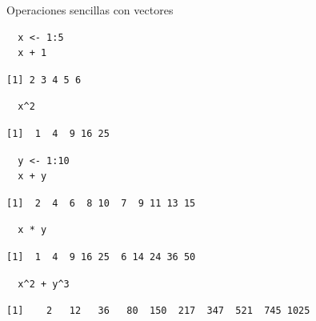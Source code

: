 \documentclass[xcolor={usenames,svgnames,dvipsnames}]{beamer}
\begin{document}
\begin{frame}[fragile,label=sec-2-1-4]{Operaciones sencillas con vectores}
 \lstset{language=R,label= ,caption= ,numbers=none}
\begin{lstlisting}
  x <- 1:5
  x + 1
\end{lstlisting}

\begin{verbatim}
[1] 2 3 4 5 6
\end{verbatim}

\lstset{language=R,label= ,caption= ,numbers=none}
\begin{lstlisting}
  x^2
\end{lstlisting}

\begin{verbatim}
[1]  1  4  9 16 25
\end{verbatim}

\lstset{language=R,label= ,caption= ,numbers=none}
\begin{lstlisting}
  y <- 1:10
  x + y
\end{lstlisting}

\begin{verbatim}
[1]  2  4  6  8 10  7  9 11 13 15
\end{verbatim}

\lstset{language=R,label= ,caption= ,numbers=none}
\begin{lstlisting}
  x * y
\end{lstlisting}

\begin{verbatim}
[1]  1  4  9 16 25  6 14 24 36 50
\end{verbatim}

\lstset{language=R,label= ,caption= ,numbers=none}
\begin{lstlisting}
  x^2 + y^3
\end{lstlisting}

\begin{verbatim}
[1]    2   12   36   80  150  217  347  521  745 1025
\end{verbatim}
\end{frame}
\end{document}
